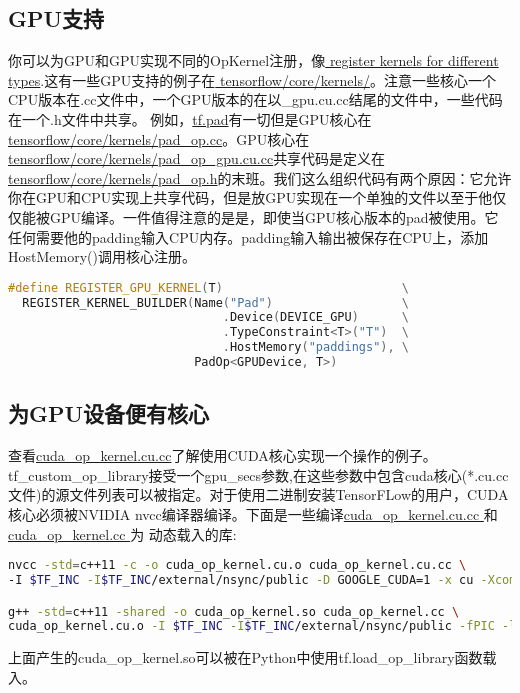 \subsection{GPU支持}
你可以为GPU和GPU实现不同的OpKernel注册，像\href{https://www.tensorflow.org/extend/adding_an_op?hl=zh-cn#polymorphism}{ register kernels for different types}.这有一些GPU支持的例子在\href{https://www.github.com/tensorflow/tensorflow/blob/r1.4/tensorflow/core/kernels/}{ tensorflow/core/kernels/}。注意一些核心一个CPU版本在.cc文件中，一个GPU版本的在以\_gpu.cu.cc结尾的文件中，一些代码在一个.h文件中共享。
例如，\href{https://www.tensorflow.org/api_docs/python/tf/pad?hl=zh-cn}{tf.pad}有一切但是GPU核心在\href{https://www.github.com/tensorflow/tensorflow/blob/r1.4/tensorflow/core/kernels/pad_op.cc}{tensorflow/core/kernels/pad\_op.cc}。GPU核心在\href{https://www.github.com/tensorflow/tensorflow/blob/r1.4/tensorflow/core/kernels/pad_op_gpu.cu.cc}{tensorflow/core/kernels/pad_op_gpu.cu.cc}共享代码是定义在\href{https://www.github.com/tensorflow/tensorflow/blob/r1.4/tensorflow/core/kernels/pad_op.h}{tensorflow/core/kernels/pad\_op.h}的末班。我们这么组织代码有两个原因：它允许你在GPU和CPU实现上共享代码，但是放GPU实现在一个单独的文件以至于他仅仅能被GPU编译。一件值得注意的是是，即使当GPU核心版本的pad被使用。它任何需要他的padding输入CPU内存。padding输入输出被保存在CPU上，添加HostMemory()调用核心注册。

\begin{lstlisting}[language=C++]
#define REGISTER_GPU_KERNEL(T)                         \
  REGISTER_KERNEL_BUILDER(Name("Pad")                  \
                              .Device(DEVICE_GPU)      \
                              .TypeConstraint<T>("T")  \
                              .HostMemory("paddings"), \
                          PadOp<GPUDevice, T>)

\end{lstlisting}
\subsection{为GPU设备便有核心}
查看\href{https://www.github.com/tensorflow/tensorflow/blob/r1.4/tensorflow/examples/adding_an_op/cuda_op_kernel.cu.cc}{cuda\_op\_kernel.cu.cc}了解使用CUDA核心实现一个操作的例子。tf\_custom\_op\_library接受一个gpu\_secs参数,在这些参数中包含cuda核心(*.cu.cc文件)的源文件列表可以被指定。对于使用二进制安装TensorFLow的用户，CUDA核心必须被NVIDIA nvcc编译器编译。下面是一些编译\href{https://www.github.com/tensorflow/tensorflow/blob/r1.4/tensorflow/examples/adding_an_op/cuda_op_kernel.cu.cc}{cuda\_op\_kernel.cu.cc }和\href{https://www.github.com/tensorflow/tensorflow/blob/r1.4/tensorflow/examples/adding_an_op/cuda_op_kernel.cc}{cuda\_op\_kernel.cc }为 动态载入的库:
\begin{lstlisting}[language=Bash]
nvcc -std=c++11 -c -o cuda_op_kernel.cu.o cuda_op_kernel.cu.cc \
-I $TF_INC -I$TF_INC/external/nsync/public -D GOOGLE_CUDA=1 -x cu -Xcompiler -fPIC

g++ -std=c++11 -shared -o cuda_op_kernel.so cuda_op_kernel.cc \
cuda_op_kernel.cu.o -I $TF_INC -I$TF_INC/external/nsync/public -fPIC -lcudart -L$TF_LIB -ltensorflow_framework
\end{lstlisting}
上面产生的cuda\_op\_kernel.so可以被在Python中使用tf.load\_op\_library函数载入。

